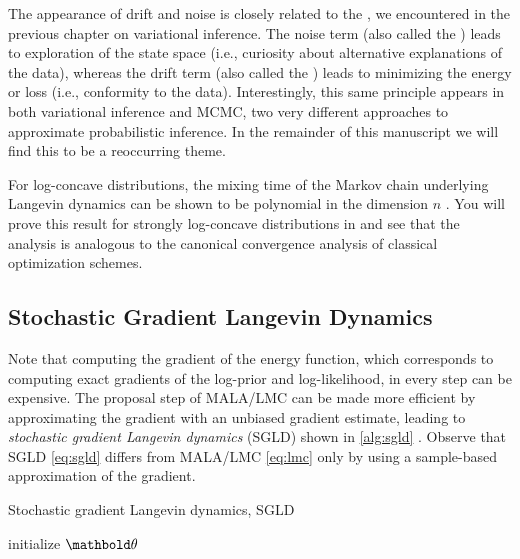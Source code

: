 The appearance of drift and noise is closely related to the , we encountered in the previous chapter on variational inference.
The noise term (also called the ) leads to exploration of the state space (i.e., curiosity about alternative explanations of the data), whereas the drift term (also called the ) leads to minimizing the energy or loss (i.e., conformity to the data).
Interestingly, this same principle appears in both variational inference and MCMC, two very different approaches to approximate probabilistic inference.
In the remainder of this manuscript we will find this to be a reoccurring theme.

For log-concave distributions, the mixing time of the Markov chain underlying Langevin dynamics can be shown to be polynomial in the dimension $n$ \citep{vempala2019rapid}.
You will prove this result for strongly log-concave distributions in  and see that the analysis is analogous to the canonical convergence analysis of classical optimization schemes.

\subsection{Stochastic Gradient Langevin Dynamics}

Note that computing the gradient of the energy function, which corresponds to computing exact gradients of the log-prior and log-likelihood, in every step can be expensive.
The proposal step of MALA/LMC can be made more efficient by approximating the gradient with an unbiased gradient estimate, leading to \emph{stochastic gradient Langevin dynamics} (SGLD) shown in \cref{alg:sgld} \citep{welling2011bayesian}.
Observe that SGLD \eqref{eq:sgld} differs from MALA/LMC \eqref{eq:lmc} only by using a sample-based approximation of the gradient.

\begin{algorithm}
  \caption{Stochastic gradient Langevin dynamics, SGLD}\label{alg:sgld}
  initialize $\vtheta$\;
\end{algorithm}

